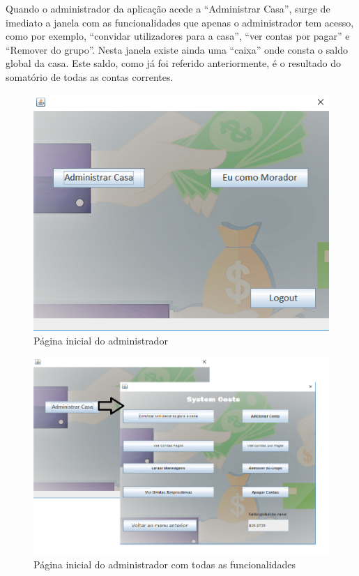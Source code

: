 \newpage \clearpage

Quando o administrador da aplicação acede a “Administrar Casa”, surge de imediato a janela com as funcionalidades que apenas o administrador tem acesso, como por exemplo, “convidar utilizadores para a casa”, “ver contas por pagar” e “Remover do grupo”. Nesta janela existe ainda uma “caixa” onde consta o saldo global da casa. Este saldo, como já foi referido anteriormente, é o resultado do somatório de todas as contas correntes. 


\begin{figure}[h!]
	\centering
	\includegraphics[scale=0.6]{imagens/interface/paginicialadmin}  
	\caption{Página inicial do administrador}  
\end{figure}

\begin{figure}[h!]
	\centering
	\includegraphics[scale=0.6]{imagens/interface/botaoadmin}  
	\caption{Página inicial do administrador com todas as funcionalidades}  
\end{figure}

